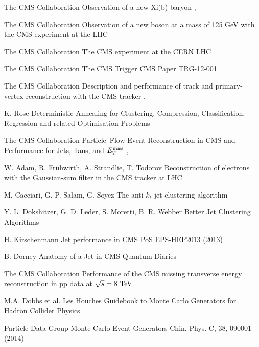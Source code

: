 {The CMS Collaboration}
{Observation of a new Xi(b) baryon}
{, }

{The CMS Collaboration}
{Observation of a new boson at a mass of 125 GeV with the CMS experiment at the LHC}
{}

{The CMS Collaboration}
{The CMS experiment at the CERN LHC}
{}

{The CMS Collaboration}
{The CMS Trigger}
{CMS Paper TRG-12-001}

{The CMS Collaboration}
{Description and performance of track and primary-vertex reconstruction with the CMS tracker}
{, }

{K. Rose}
{Deterministic Annealing for Clustering, Compression, Classification, Regression and related Optimisation Problems}
{}

{The CMS Collaboration}
{Particle–Flow Event Reconstruction in CMS and Performance for Jets, Taus, and $E_T^\text{miss}$}
{, }

{W. Adam, R. Frühwirth, A. Strandlie, T. Todorov}
{Reconstruction of electrons with the Gaussian-sum filter in the CMS tracker at LHC}
{}

{M. Cacciari, G. P. Salam, G. Soyez}
{The anti-$k_t$ jet clustering algorithm}
{}

{Y. L. Dokshitzer, G. D. Leder, S. Moretti, B. R. Webber}
{Better Jet Clustering Algorithms}
{}

{H. Kirschenmann}
{Jet performance in CMS}
{PoS EPS-HEP2013 (2013)}

{B. Dorney}
{Anatomy of a Jet in CMS}
{Quantum Diaries}

{The CMS Collaboration}
{Performance of the CMS missing transverse energy reconstruction in pp data at $\sqrt{s} = 8~\text{TeV}$}
{}

{M.A. Dobbs et al.}
{Les Houches Guidebook to Monte Carlo Generators for Hadron Collider Physics}
{}

{Particle Data Group}
{Monte Carlo Event Generators}
{Chin. Phys. C, 38, 090001 (2014)}

